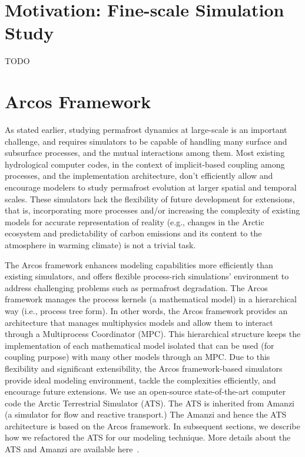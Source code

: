 \documentclass[review]{elsarticle}
\begin{document}
\section{Motivation: Fine-scale Simulation Study}\label{motivation}
TODO

\section{Arcos Framework}\label{arcos-framework}
As stated earlier, studying permafrost dynamics at large-scale is an important challenge, and requires simulators to be capable of handling many surface and subsurface processes, and the mutual interactions among them. Most existing hydrological computer codes, in the context of implicit-based coupling among processes, and the implementation architecture, don't efficiently allow and encourage modelers to study permafrost evolution at larger spatial and temporal scales. These simulators lack the flexibility of future development for extensions, that is, incorporating more processes and/or increasing the complexity of existing models for accurate representation of reality (e.g., changes in the Arctic ecosystem and predictability of carbon emissions and its content to the atmosphere in warming climate) is not a trivial task.

The Arcos framework enhances modeling capabilities more efficiently than existing simulators, and offers flexible process-rich simulations' environment to address challenging problems such as permafrost degradation. The Arcos framework manages the process kernels (a mathematical model) in a hierarchical way (i.e., process tree form). In other words, the Arcos framework provides an architecture that manages multiphysics models and allow them to interact through a Multiprocess Coordinator (MPC). This hierarchical structure keeps the implementation of each mathematical model isolated that can be used (for coupling purpose) with many other models through an MPC. Due to this flexibility and significant extensibility, the Arcos framework-based simulators provide ideal modeling environment, tackle the complexities efficiently, and encourage future extensions. 
We use an open-source state-of-the-art computer code the Arctic Terrestrial Simulator (ATS). The ATS is inherited from Amanzi (a simulator for flow and reactive transport.) The Amanzi and hence the ATS architecture is based on the Arcos framework. In subsequent sections, we describe how we refactored the ATS for our modeling technique. More details about the ATS and Amanzi are available here~\cite{ecoon2016managing, moulton2012high, spainter2016integrated}.
\end{document}
